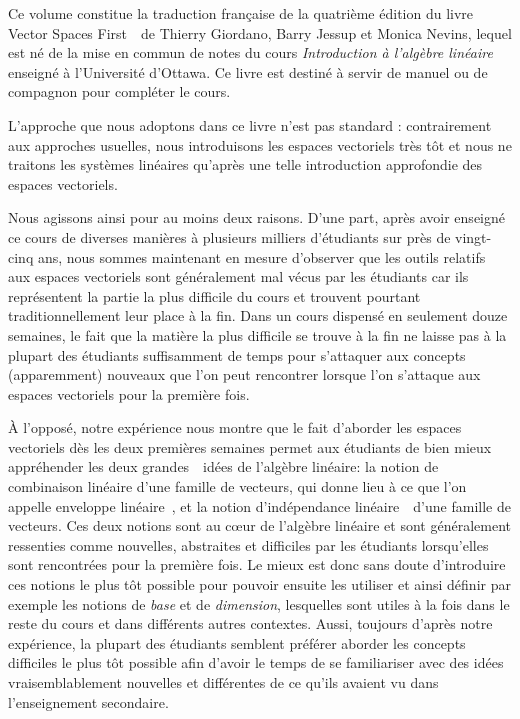 %
%

\preface


Ce volume constitue la traduction fran\c{c}aise de la quatri\`eme \'edition du livre \og Vector Spaces First~\fg\ de Thierry Giordano, Barry Jessup et Monica Nevins, lequel est n\'e de la mise en commun de notes du cours \emph{Introduction à l'algèbre linéaire} enseigné à l'Université d'Ottawa. Ce livre est destiné à servir de manuel ou de compagnon pour compléter le cours.



L'approche que nous adoptons dans ce livre n'est pas standard : contrairement aux approches usuelles, nous introduisons les espaces vectoriels très tôt et nous ne traitons les systèmes linéaires qu'après une telle introduction approfondie des espaces vectoriels.

Nous agissons ainsi pour au moins deux raisons. D'une part, après avoir enseigné ce cours de diverses manières à plusieurs milliers d'étudiants sur près de vingt-cinq ans, nous sommes maintenant en mesure d'observer que les outils relatifs aux espaces vectoriels sont généralement mal vécus par les étudiants car ils représentent la partie la plus difficile du cours et trouvent pourtant traditionnellement leur place à la fin. Dans un cours dispensé en seulement douze semaines, le fait que la matière la plus difficile se trouve à la fin ne laisse pas à la plupart des étudiants suffisamment de temps pour s'attaquer aux concepts (apparemment) nouveaux que l'on peut rencontrer lorsque l'on s'attaque aux espaces vectoriels pour la première fois.

À l'opposé, notre expérience nous montre que le fait d'aborder les espaces vectoriels dès les deux premières semaines permet aux étudiants de bien mieux appréhender les deux \og grandes~\fg\ idées de l'algèbre linéaire: la notion de combinaison linéaire d'une famille de vecteurs, qui donne lieu à ce que l'on appelle \og enveloppe lin\'eaire~\fg, et la notion d'\og indépendance linéaire~\fg\ d'une famille de vecteurs. Ces deux notions sont au cœur de l'algèbre linéaire et sont généralement ressenties comme nouvelles, abstraites et difficiles par les étudiants lorsqu'elles sont rencontrées pour la première fois. Le mieux est donc sans doute d'introduire ces notions le plus tôt possible pour pouvoir ensuite les utiliser et ainsi définir par exemple les notions de {\it base} et de {\it dimension}, lesquelles sont utiles à la fois dans le reste du cours et dans différents autres contextes. Aussi, toujours d'après notre expérience, la plupart des étudiants semblent préférer aborder les concepts difficiles le plus tôt possible afin d'avoir le temps de se familiariser avec des idées vraisemblablement nouvelles et différentes de ce qu'ils avaient vu dans l'enseignement secondaire.

